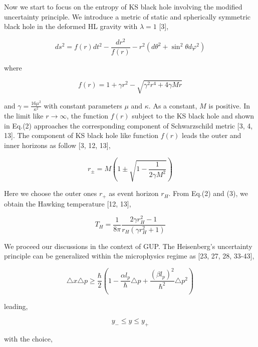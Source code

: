 \documentclass[graphicx, 12pt]{article}
\begin{document}
Now we start to focus on the entropy of KS black hole involving
the modified uncertainty principle. We introduce a metric of
static and spherically symmetric black hole in the deformed HL
gravity with $\lambda=1$ [3],

\begin{equation}
ds^{2}=f(r)dt^{2}-\frac{dr^{2}}{f(r)}-r^{2}(d\theta^{2}+\sin^{2}\theta
d\varphi^{2})
\end{equation}

\noindent where

\begin{equation}
f(r)=1+\gamma r^{2}-\sqrt{\gamma^{2}r^{4}+4\gamma Mr}
\end{equation}

\noindent and $\gamma=\frac{16\mu^{2}}{\kappa^{2}}$ with constant
parameters $\mu$ and $\kappa$. As a constant, $M$ is positive. In
the limit like $r\longrightarrow\infty$, the function $f(r)$
subject to the KS black hole and shown in Eq.(2) approaches the
corresponding component of Schwarzschild metric [3, 4, 13]. The
component of KS black hole like function $f(r)$ leads the outer
and inner horizons as follow [3, 12, 13],

\begin{equation}
r_{\pm}=M(1\pm\sqrt{1-\frac{1}{2\gamma M^{2}}})
\end{equation}

\noindent Here we choose the outer ones $r_{+}$ as event horizon
$r_{H}$. From Eq.(2) and (3), we obtain the Hawking temperature
[12, 13],

\begin{equation}
T_{H}=\frac{1}{8\pi}\frac{2\gamma r_{H}^{2}-1}{r_{H}(\gamma
r_{H}^{2}+1)}
\end{equation}

We proceed our discussions in the context of GUP. The Heisenberg's
uncertainty principle can be generalized within the microphysics
regime as [23, 27, 28, 33-43],

\begin{equation}
\triangle x\triangle p\geq\frac{\hbar}{2}(1-\frac{\alpha
l_{p}}{\hbar}\triangle p+\frac{(\beta
l_{p})^{2}}{\hbar^{2}}\triangle p^{2})
\end{equation}

\noindent leading,

\begin{equation}
y_{-}\leq y\leq y_{+}
\end{equation}

\noindent with the choice,
\end{document}
